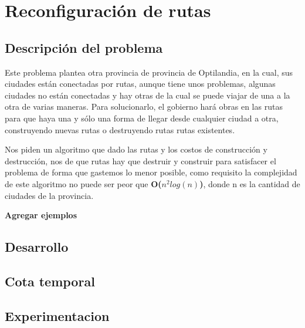\section{Reconfiguración de rutas}

\subsection{Descripción del problema}
Este problema plantea otra provincia de provincia de Optilandia, en la cual, sus ciudades están conectadas por rutas, aunque tiene unos problemas, algunas ciudades no están conectadas y hay otras de la cual se puede viajar de una a la otra de varias maneras. 
Para solucionarlo, el gobierno hará obras en las rutas para que haya una y sólo una forma de llegar desde cualquier ciudad a otra, construyendo nuevas rutas o destruyendo rutas rutas existentes.
\\
\par
Nos piden un algoritmo que dado las rutas y los costos de construcción y destrucción, nos de que rutas hay que destruir y construir para satisfacer el problema de forma que gastemos lo menor posible, como requisito la complejidad de este algoritmo no puede ser peor que \textbf{O($n^2log(n)$)}, donde n es la cantidad de ciudades de la provincia.
\\
\par
\textbf{Agregar ejemplos}
\\
\par
\subsection{Desarrollo}

\subsection{Cota temporal}

\subsection{Experimentacion}

\pagebreak